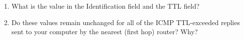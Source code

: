 \begin{enumerate}[label=\bfseries Problem \arabic*:,leftmargin=*,labelindent=1em]
        \item What is the value in the Identification field and the TTL field?\\[0.2mm]
        \soln
        \item Do these values remain unchanged for all of the ICMP TTL-exceeded replies
        sent to your computer by the nearest (first hop) router? Why?\\[0.2mm]
        \soln
    \end{enumerate}
\newpage